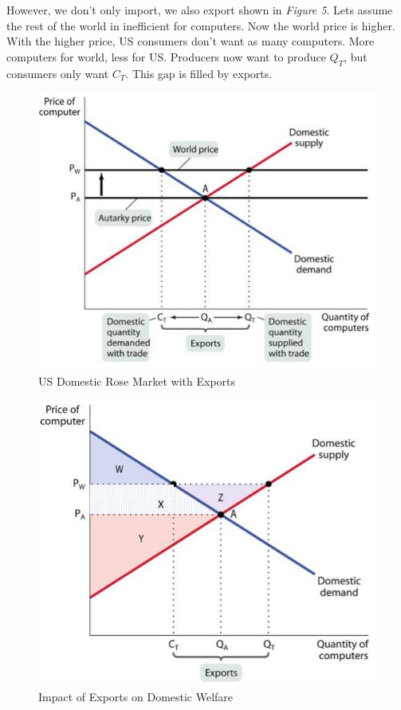 \documentclass{article}
\begin{document}
However, we don't only import, we also export shown in \textit{Figure 5}. Lets
assume the rest of the world in inefficient for computers. Now the world price
is higher. With the higher price, US consumers don't want as many computers.
More computers for world, less for US. Producers now want to produce $Q_T$, but
consumers only want $C_T$. This gap is filled by exports.

\begin{figure}[H]
    \centering
    \includegraphics[scale=0.9]{"Figure 5"}
    \caption{US Domestic Rose Market with Exports}
\end{figure}

\begin{figure}[H]
    \centering
    \includegraphics[scale=0.9]{"Figure 6"}
    \caption{Impact of Exports on Domestic Welfare}
\end{figure}
\end{document}
